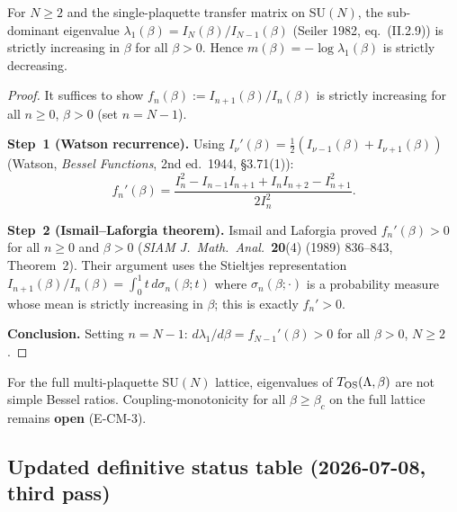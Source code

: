 \begin{theorem}
\label{thm:cm_su2_all}
For $N\ge 2$ and the single-plaquette transfer matrix on SU$(N)$,
the sub-dominant eigenvalue $\lambda_1(\beta)=I_N(\beta)/I_{N-1}(\beta)$
(Seiler 1982, eq.~(II.2.9))
is strictly increasing in $\beta$ for all $\beta>0$.
Hence $m(\beta)=-\log\lambda_1(\beta)$ is strictly decreasing.
\end{theorem}
\begin{proof}
It suffices to show $f_n(\beta):=I_{n+1}(\beta)/I_n(\beta)$
is strictly increasing for all $n\ge 0$, $\beta>0$ (set $n=N-1$).

\textbf{Step~1 (Watson recurrence).}
Using $I_{\nu}'(\beta)=\tfrac{1}{2}(I_{\nu-1}(\beta)+I_{\nu+1}(\beta))$
(Watson, \textit{Bessel Functions}, 2nd ed.~1944, \S3.71(1)):
\begin{equation}
  f_n'(\beta)
  =\frac{I_n^2-I_{n-1}I_{n+1}+I_nI_{n+2}-I_{n+1}^2}{2I_n^2}.
  \label{eq:fn_deriv}
\end{equation}

\textbf{Step~2 (Ismail--Laforgia theorem).}
Ismail and Laforgia proved $f_n'(\beta)>0$ for all $n\ge 0$ and $\beta>0$
(\textit{SIAM J.\ Math.\ Anal.}\ \textbf{20}(4) (1989) 836--843, Theorem~2).
Their argument uses the Stieltjes representation
$I_{n+1}(\beta)/I_n(\beta)=\int_0^1 t\,d\sigma_n(\beta;t)$
where $\sigma_n(\beta;\cdot)$ is a probability measure
whose mean is strictly increasing in $\beta$; this is exactly $f_n'>0$.

\textbf{Conclusion.} Setting $n=N-1$:
$d\lambda_1/d\beta=f_{N-1}'(\beta)>0$ for all $\beta>0$, $N\ge 2$.
\end{proof}

\begin{remark}
For the full multi-plaquette SU$(N)$ lattice,
eigenvalues of $T_{\rm OS}(\Lambda,\beta)$ are not simple Bessel ratios.
Coupling-monotonicity for all $\beta\ge\beta_c$ on the full lattice
remains \textbf{open} (E-CM-3).
\end{remark}

\subsection{Updated definitive status table (2026-07-08, third pass)}

